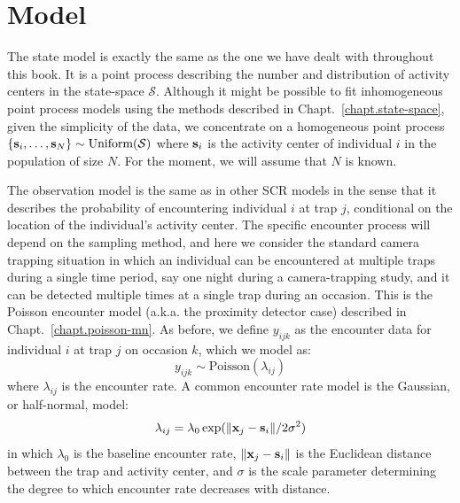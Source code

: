 
\section{Model}

The state model is exactly the same as the one we have dealt with
throughout
this book. It is a point process describing the number and distribution of
activity centers in the state-space $\mathcal{S}$. Although it might
be possible to fit inhomogeneous point process models using the
methods described in Chapt.~\ref{chapt.state-space},
given the simplicity of the data, we concentrate on a homogeneous point process
$\{{\bf s}_i, \ldots, {\bf s}_N\} \sim \text{Uniform}(\mathcal{S})$
where ${\bf s}_i$ is the activity center of individual $i$ in the
population of size $N$. For the moment, we will assume that $N$ is
known.

The observation model is the same as in other SCR models %
in the sense that it describes the probability of encountering individual
$i$ at trap $j$, conditional on the location of the individual's
activity center. The specific encounter process will depend on the
sampling method, and here we consider the standard camera trapping
situation in which an individual can be encountered at multiple traps
during a single time period, say one night during a camera-trapping
study, and it can be detected multiple times at a single trap during
an occasion. This is the Poisson encounter model (a.k.a. the proximity
detector case) described in
Chapt.~\ref{chapt.poisson-mn}. As before, we define $y_{ijk}$ as the
encounter data for individual $i$ at trap $j$ on occasion $k$, which
we model as:
\begin{equation}
 y_{ijk} \sim \mbox{Poisson}(\lambda_{ij})
\label{eq.latentPoisson}
\end{equation}
where $\lambda_{ij}$ is the encounter rate. A common encounter rate model is the
Gaussian, or half-normal, model:
\[
\lambda_{ij} = \lambda_0 \exp(\| {\bf x}_j - {\bf s}_i \| / 2\sigma^2)
\]
in which $\lambda_0$ is the baseline encounter rate,
$\| {\bf x}_j - {\bf s}_i
\|$ is the Euclidean distance between the trap and activity center, and $\sigma$ is the
scale parameter determining the degree to which encounter rate decreases with
distance.

